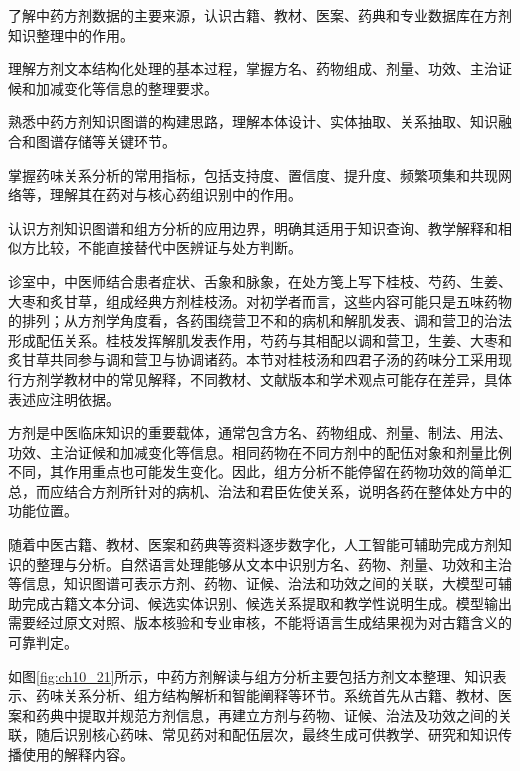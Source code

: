 \begin{sectionkeypoints}
\item 了解中药方剂数据的主要来源，认识古籍、教材、医案、药典和专业数据库在方剂知识整理中的作用。
\item 理解方剂文本结构化处理的基本过程，掌握方名、药物组成、剂量、功效、主治证候和加减变化等信息的整理要求。
\item 熟悉中药方剂知识图谱的构建思路，理解本体设计、实体抽取、关系抽取、知识融合和图谱存储等关键环节。
\item 掌握药味关系分析的常用指标，包括支持度、置信度、提升度、频繁项集和共现网络等，理解其在药对与核心药组识别中的作用。
\item 认识方剂知识图谱和组方分析的应用边界，明确其适用于知识查询、教学解释和相似方比较，不能直接替代中医辨证与处方判断。
\end{sectionkeypoints}
诊室中，中医师结合患者症状、舌象和脉象，在处方笺上写下桂枝、芍药、生姜、大枣和炙甘草，组成经典方剂桂枝汤。对初学者而言，这些内容可能只是五味药物的排列；从方剂学角度看，各药围绕营卫不和的病机和解肌发表、调和营卫的治法形成配伍关系。桂枝发挥解肌发表作用，芍药与其相配以调和营卫，生姜、大枣和炙甘草共同参与调和营卫与协调诸药。本节对桂枝汤和四君子汤的药味分工采用现行方剂学教材中的常见解释，不同教材、文献版本和学术观点可能存在差异，具体表述应注明依据。

方剂是中医临床知识的重要载体，通常包含方名、药物组成、剂量、制法、用法、功效、主治证候和加减变化等信息。相同药物在不同方剂中的配伍对象和剂量比例不同，其作用重点也可能发生变化。因此，组方分析不能停留在药物功效的简单汇总，而应结合方剂所针对的病机、治法和君臣佐使关系，说明各药在整体处方中的功能位置。

随着中医古籍、教材、医案和药典等资料逐步数字化，人工智能可辅助完成方剂知识的整理与分析。自然语言处理能够从文本中识别方名、药物、剂量、功效和主治等信息，知识图谱可表示方剂、药物、证候、治法和功效之间的关联，大模型可辅助完成古籍文本分词、候选实体识别、候选关系提取和教学性说明生成。模型输出需要经过原文对照、版本核验和专业审核，不能将语言生成结果视为对古籍含义的可靠判定。

如图\ref{fig:ch10_21}所示，中药方剂解读与组方分析主要包括方剂文本整理、知识表示、药味关系分析、组方结构解析和智能阐释等环节。系统首先从古籍、教材、医案和药典中提取并规范方剂信息，再建立方剂与药物、证候、治法及功效之间的关联，随后识别核心药味、常见药对和配伍层次，最终生成可供教学、研究和知识传播使用的解释内容。

\par
\noindent\begin{minipage}{\textwidth}
\centering
{}
\label{fig:ch10_21}
\end{minipage}
\par
